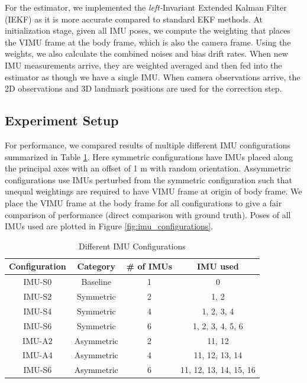 \documentclass[conference]{IEEEtran}
\begin{document}
For the estimator, we implemented the \textit{left-}Invariant Extended Kalman Filter (IEKF) \cite{IEKF} as it is more accurate compared to standard EKF methods. At initialization stage, given all IMU poses, we compute the weighting that places the VIMU frame at the body frame, which is also the camera frame. Using the weights, we also calculate the combined noises and bias drift rates. When new IMU measurements arrive, they are weighted averaged and then fed into the estimator as though we have a single IMU. When camera observations arrive, the 2D observations and 3D landmark positions are used for the correction step.

\subsection{Experiment Setup}

For performance, we compared results of multiple different IMU configurations summarized in Table \ref{tab:imu_config}. Here symmetric configurations have IMUs placed along the principal axes with an offset of 1 m with random orientation. Assymmetric configurations use IMUs perturbed from the symmetric configuration such that unequal weightings are required to have VIMU frame at origin of body frame. We place the VIMU frame at the body frame for all configurations to give a fair comparison of performance (direct comparison with ground truth). Poses of all IMUs used are plotted in Figure \ref{fig:imu_configurations}.

\begin{table}[h!]
\centering
\caption{Different IMU Configurations}
\label{tab:imu_config}
\begin{tabular}{cccc}
\toprule
\textbf{Configuration} & \textbf{Category} & \textbf{\# of IMUs} & \textbf{IMU used}  \\
\midrule
IMU-S0 & Baseline  & 1 & 0 \\
\midrule
IMU-S2 & Symmetric & 2 & 1, 2 \\
IMU-S4 & Symmetric & 4 & 1, 2, 3, 4 \\
IMU-S6 & Symmetric & 6 & 1, 2, 3, 4, 5, 6 \\
\midrule
IMU-A2 & Asymmetric & 2 & 11, 12 \\
IMU-A4 & Asymmetric & 4 & 11, 12, 13, 14 \\
IMU-S6 & Asymmetric & 6 & 11, 12, 13, 14, 15, 16 \\

\bottomrule
\end{tabular}
\end{table}
\end{document}
